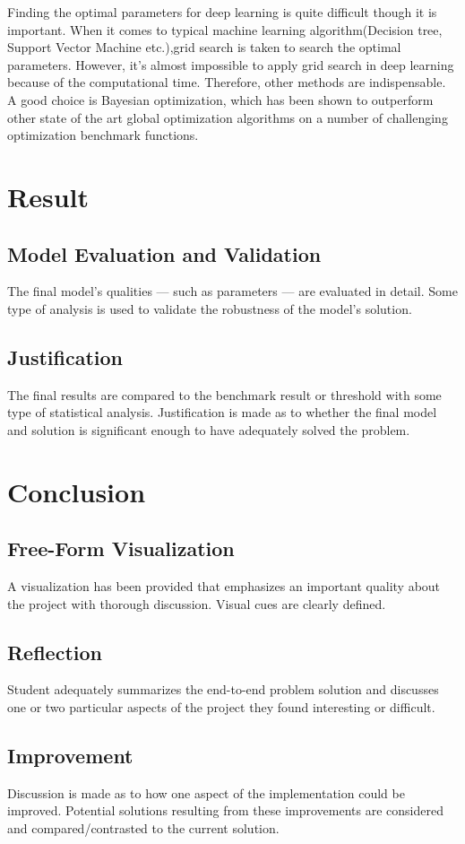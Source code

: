 \documentclass[a4paper,10pt,fleqn]{article}
\begin{document}
Finding the optimal parameters for deep learning is quite difficult though it is important. When it comes to typical machine learning algorithm(Decision tree, Support Vector Machine etc.),grid search is taken to search the optimal parameters. However, it's almost impossible to apply grid search in deep learning because of the computational time. Therefore, other methods are indispensable. A good choice is Bayesian optimization, which has been shown to outperform other state of the art global optimization algorithms on a number of challenging optimization benchmark functions.
\section{Result}
\subsection{Model Evaluation and Validation}
The final model’s qualities — such as parameters — are evaluated in detail. Some type of analysis is used to validate the robustness of the model’s solution.

\subsection{Justification}
The final results are compared to the benchmark result or threshold with some type of statistical analysis. Justification is made as to whether the final model and solution is significant enough to have adequately solved the problem.




\section{Conclusion}
\subsection{Free-Form Visualization}
A visualization has been provided that emphasizes an important quality about the project with thorough discussion. Visual cues are clearly defined.

\subsection{Reflection}
Student adequately summarizes the end-to-end problem solution and discusses one or two particular aspects of the project they found interesting or difficult.

\subsection{Improvement}
Discussion is made as to how one aspect of the implementation could be improved. Potential solutions resulting from these improvements are considered and compared/contrasted to the current solution.
\end{document}
